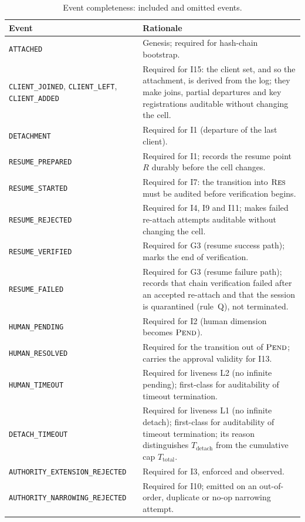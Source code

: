 \begin{longtable}{p{} p{}}
\caption{Event completeness: included and omitted events.}
\label{tab:event-completeness}\\
\toprule
\textbf{Event} & \textbf{Rationale} \\
\midrule
\texttt{ATTACHED} & Genesis; required for hash-chain bootstrap. \\
\texttt{CLIENT\_JOINED}, \texttt{CLIENT\_LEFT}, \texttt{CLIENT\_ADDED} &
Required for I15: the client set, and so the attachment, is derived from
the log; they make joins, partial departures and key registrations
auditable without changing the cell. \\
\texttt{DETACHMENT} & Required for I1 (departure of the last client). \\
\texttt{RESUME\_PREPARED} & Required for I1; records the resume
point $R$ durably before the cell changes. \\
\texttt{RESUME\_STARTED} & Required for I7: the transition into
$\textsc{Res}$ must be audited before verification begins. \\
\texttt{RESUME\_REJECTED} & Required for I4, I9 and I11; makes failed
re-attach attempts auditable without changing the cell. \\
\texttt{RESUME\_VERIFIED} & Required for G3 (resume
success path); marks the end of verification. \\
\texttt{RESUME\_FAILED} & Required for G3 (resume
failure path); records that chain verification failed after an accepted
re-attach and that the session is quarantined (rule~Q), not terminated. \\
\texttt{HUMAN\_PENDING} & Required for I2 (human dimension becomes
$\textsc{Pend}$). \\
\texttt{HUMAN\_RESOLVED} & Required for the transition out of
$\textsc{Pend}$; carries the approval validity for I13. \\
\texttt{HUMAN\_TIMEOUT} & Required for liveness L2 (no infinite
pending); first-class for auditability of timeout termination. \\
\texttt{DETACH\_TIMEOUT} & Required for liveness L1 (no infinite
detach); first-class for auditability of timeout termination; its reason
distinguishes $T_{\text{detach}}$ from the cumulative cap
$T_{\text{total}}$. \\
\texttt{AUTHORITY\_EXTENSION\_REJECTED} & Required for I3, enforced and observed. \\
\texttt{AUTHORITY\_NARROWING\_REJECTED} & Required for I10; emitted on an out-of-order, duplicate or no-op narrowing attempt. \\

\end{longtable}
